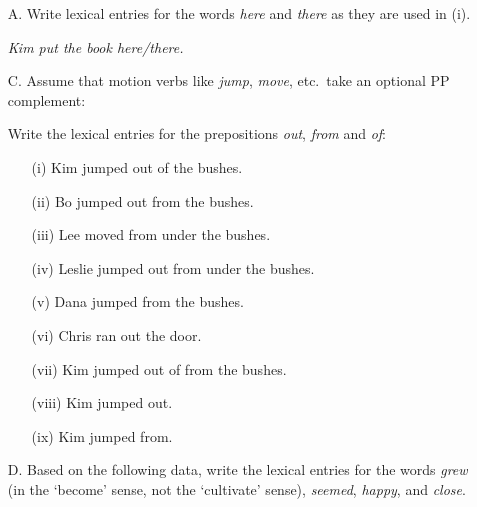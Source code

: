 \documentclass[a4paper,landscape,headrule,footrule]{foils}
\begin{document}
\begin{itemize}

\item[A.] Write lexical entries for the words {\it here} and {\it there} as
they are used in (i).

   \begin{exe}
   \it Kim put the book here/there.
   \end{exe}

\newpage


\item[C.] Assume that motion verbs like {\it jump}, {\it move}, etc.\
take an optional PP complement:

\begin{quote}
\avm{[ COMPS & < (PP) > ]}
\end{quote}
%
Write
the lexical entries for the
prepositions {\it out}, {\it from} and {\it of}:

   \begin{itemize}
   \item[(i)] Kim jumped out of the bushes.
   \item[(ii)] Bo jumped out from the bushes.
   \item[(iii)] Lee moved from under the bushes.   
   \item[(iv)] Leslie jumped out from under the bushes.
   \item[(v)] Dana jumped from the bushes.
   \item[(vi)] Chris ran out the door.
   \item[(vii)] \bad Kim jumped out of from the bushes.
   \item[(viii)] Kim jumped out.
   \item[(ix)] \bad Kim jumped from.
   \end{itemize}
\newpage
\item[D.] Based on the following data, 
write 
the  lexical entries for
the words {\it grew} (in the `become' sense, not the `cultivate'
sense), {\it seemed}, {\it happy}, and {\it close}. 


\end{itemize}
\end{document}
